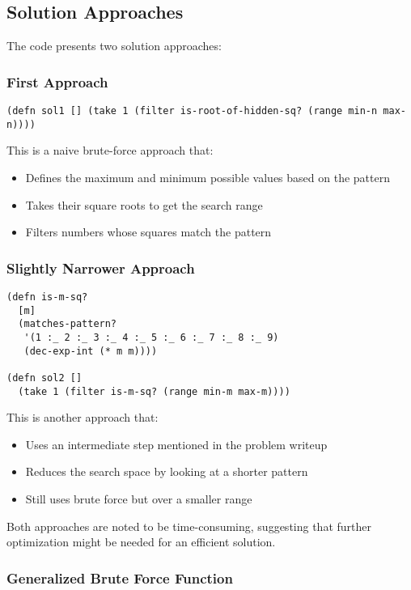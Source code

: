 \subsection{Solution Approaches}

The code presents two solution approaches:

\subsubsection{First Approach}
\begin{lstlisting}
(defn sol1 [] (take 1 (filter is-root-of-hidden-sq? (range min-n max-n))))
\end{lstlisting}

This is a naive brute-force approach that:
\begin{itemize}
    \item Defines the maximum and minimum possible values based on the pattern
    \item Takes their square roots to get the search range
    \item Filters numbers whose squares match the pattern
\end{itemize}

\subsubsection{Slightly Narrower Approach}
\begin{lstlisting}
(defn is-m-sq?
  [m]
  (matches-pattern?
   '(1 :_ 2 :_ 3 :_ 4 :_ 5 :_ 6 :_ 7 :_ 8 :_ 9)
   (dec-exp-int (* m m))))

(defn sol2 [] 
  (take 1 (filter is-m-sq? (range min-m max-m))))
\end{lstlisting}

This is another approach that:
\begin{itemize}
    \item Uses an intermediate step mentioned in the problem writeup
    \item Reduces the search space by looking at a shorter pattern
    \item Still uses brute force but over a smaller range
\end{itemize}

Both approaches are noted to be time-consuming, suggesting that further optimization might be needed for an efficient solution.


\subsubsection{Generalized Brute Force Function}

